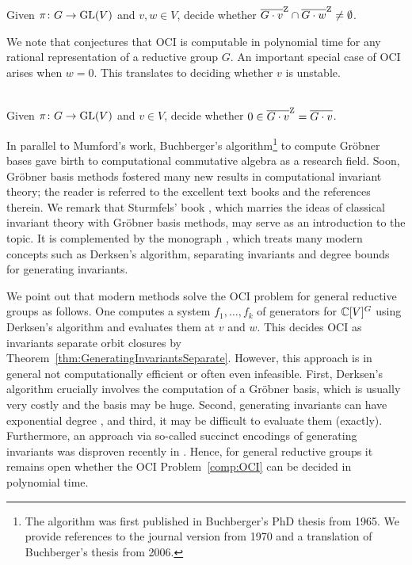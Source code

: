 \begin{compprob}
	\label{comp:OCI}   \ \\
	Given $\pi \colon G \to \operatorname{GL}(V)$ and $v,w \in V$, decide whether $\overline{G \cdot v}^{\operatorname{Z}} \cap \overline{G \cdot w}^{\operatorname{Z}} \neq \emptyset$.
\end{compprob}

We note that \cite{mulmuley2017geometric} conjectures that OCI is computable in polynomial time for any rational representation of a reductive group $G$.
An important special case of OCI arises when $w=0$. This translates to deciding whether $v$ is unstable.

\begin{compprob}
	\label{comp:NCM}  
	\ \\
	Given $\pi \colon G \to \operatorname{GL}(V)$ and $v \in V$, decide whether $0 \in \overline{G \cdot v}^{\operatorname{Z}} = \overline{G \cdot v}$.
\end{compprob}

In parallel to Mumford's work, Buchberger's algorithm\footnote{The algorithm was first published in Buchberger's PhD thesis from 1965. We provide references to the journal version from 1970 and a translation of Buchberger's thesis from 2006.} \cite{BuchbergerPhDJournal, BuchbergerPhDTranslation}
to compute Gr\"obner bases gave birth to computational commutative algebra as a research field. Soon, Gr\"obner basis methods fostered many new results in computational invariant theory; the reader is referred to the excellent text books \cite{SturmfelsBookInvariant, DerksenKemperBook} and the references therein. We remark that Sturmfels' book \cite{SturmfelsBookInvariant}, which marries the ideas of classical invariant theory with Gr\"obner basis methods, may serve as an introduction to the topic. It is complemented by the monograph \cite{DerksenKemperBook}, which treats many modern concepts such as Derksen's algorithm, separating invariants and degree bounds for generating invariants.

We point out that modern methods solve the OCI problem for general reductive groups as follows. One computes a system $f_1, \ldots, f_k$ of generators for $\mathbb C[V]^G$ using Derksen's algorithm \cite{derksen1999ComputationOfInvariants} and evaluates them at $v$ and $w$. This decides OCI as invariants separate orbit closures by Theorem~\ref{thm:GeneratingInvariantsSeparate}. However, this approach is in general not computationally efficient or often even infeasible. First, Derksen's algorithm crucially involves the computation of a Gr\"obner basis, which is usually very costly and the basis may be huge. Second, generating invariants can have exponential degree \cite{derksen2020exponential}, and third, it may be difficult to evaluate them (exactly).
Furthermore, an approach via so-called succinct encodings of generating invariants \cite{mulmuley2017geometric} was disproven recently in \cite{garg2019search}.
Hence, for general reductive groups it remains open whether the OCI Problem~\ref{comp:OCI} can be decided in polynomial time.

